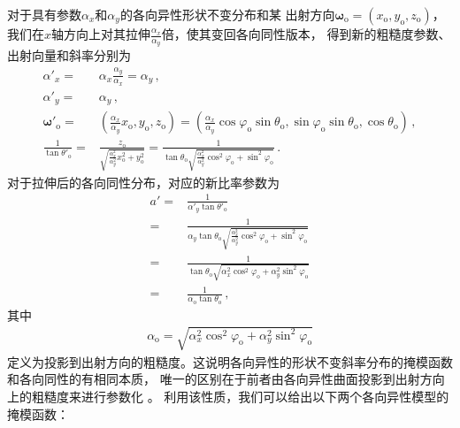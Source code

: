 对于具有参数$\alpha_x$和$\alpha_y$的各向异性形状不变分布和某
出射方向${\bm\omega}_{\mathrm{o}}=(x_{\mathrm{o}},y_{\mathrm{o}},z_{\mathrm{o}})$，
我们在$x$轴方向上对其拉伸$\displaystyle\frac{\alpha_x}{\alpha_y}$倍，使其变回各向同性版本，
得到新的粗糙度参数、出射向量和斜率分别为
\begin{align}
    \alpha'_x=&\alpha_x\frac{\alpha_y}{\alpha_x}=\alpha_y\, ,\\
    \alpha'_y=&\alpha_y\, ,\\
    {\bm\omega}'_{\mathrm{o}}=&(\frac{\alpha_x}{\alpha_y}x_{\mathrm{o}},y_{\mathrm{o}},z_{\mathrm{o}})
    =(\frac{\alpha_x}{\alpha_y}\cos\varphi_{\mathrm{o}}\sin\theta_{\mathrm{o}},
    \sin\varphi_{\mathrm{o}}\sin\theta_{\mathrm{o}},\cos\theta_{\mathrm{o}})\, ,\\
    \frac{1}{\tan\theta'_{\mathrm{o}}}=&\frac{z_{\mathrm{o}}}
    {\sqrt{\displaystyle\frac{\alpha_x^2}{\alpha_y^2}x_{\mathrm{o}}^2+y_{\mathrm{o}}^2}}
    =\frac{1}{\tan\theta_{\mathrm{o}}\sqrt{\displaystyle\frac{\alpha_x^2}{\alpha_y^2}\cos^2\varphi_{\mathrm{o}}+\sin^2\varphi_{\mathrm{o}}}}\, .
\end{align}
对于拉伸后的各向同性分布，对应的新比率参数为
\begin{align}
    a'=&\frac{1}{\alpha'_y\tan\theta'_{\mathrm{o}}}\nonumber\\
      =&\frac{1}{\alpha_y\tan\theta_{\mathrm{o}}\sqrt{\displaystyle\frac{\alpha_x^2}{\alpha_y^2}\cos^2\varphi_{\mathrm{o}}+\sin^2\varphi_{\mathrm{o}}}}\nonumber\\
      =&\frac{1}{\tan\theta_{\mathrm{o}}\sqrt{\alpha_x^2\cos^2\varphi_{\mathrm{o}}+\alpha_y^2\sin^2\varphi_{\mathrm{o}}}}\nonumber\\
      =&\frac{1}{\alpha_{\mathrm{o}}\tan\theta_{\mathrm{o}}}\, ,
\end{align}
其中
\begin{align}
    \alpha_{\mathrm{o}}=\sqrt{\alpha_x^2\cos^2\varphi_{\mathrm{o}}+\alpha_y^2\sin^2\varphi_{\mathrm{o}}}
\end{align}
定义为投影到出射方向的粗糙度。这说明各向异性的形状不变斜率分布的掩模函数和各向同性的有相同本质，
唯一的区别在于前者由各向异性曲面投影到出射方向上的粗糙度来进行参数化
。
利用该性质，我们可以给出以下两个各向异性模型的掩模函数：

